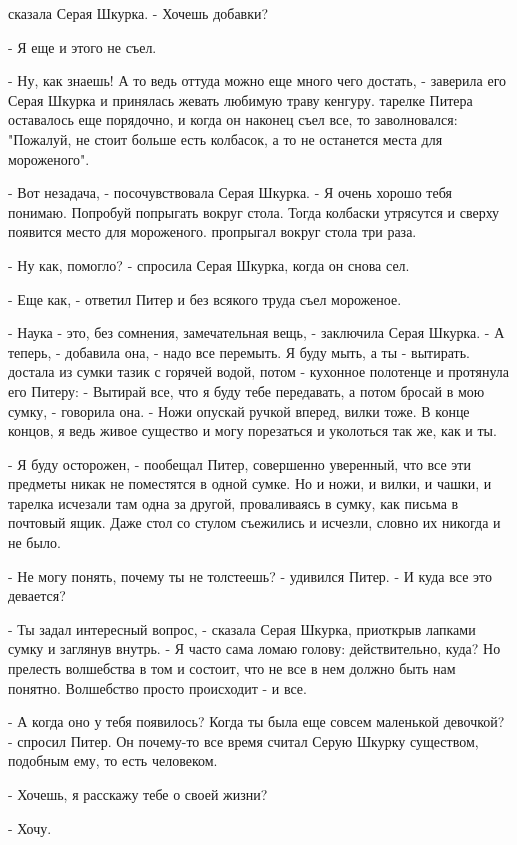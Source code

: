 сказала Серая Шкурка. - Хочешь добавки?
\par- Я еще и этого не съел.
\par- Ну, как знаешь! А то ведь оттуда можно еще много чего достать, - 
заверила его Серая Шкурка и принялась жевать любимую траву кенгуру.
 тарелке Питера оставалось еще порядочно, и когда он наконец 
съел все, то заволновался: "Пожалуй, не стоит больше есть колбасок, а 
то не останется места для мороженого".
\par- Вот незадача, - посочувствовала Серая Шкурка. - Я очень хорошо 
тебя понимаю. Попробуй попрыгать вокруг стола. Тогда колбаски 
утрясутся и сверху появится место для мороженого.
 пропрыгал вокруг стола три раза.
\par- Ну как, помогло? - спросила Серая Шкурка, когда он снова сел.
\par- Еще как, - ответил Питер и без всякого труда съел мороженое.
\par- Наука - это, без сомнения, замечательная вещь, - заключила Серая 
Шкурка. - А теперь, - добавила она, - надо все перемыть. Я буду мыть, 
а ты - вытирать.
 достала из сумки тазик с горячей водой, потом - кухонное 
полотенце и протянула его Питеру: - Вытирай все, что я буду тебе 
передавать, а потом бросай в мою сумку, - говорила она. - Ножи опускай 
ручкой вперед, вилки тоже. В конце концов, я ведь живое существо и 
могу порезаться и уколоться так же, как и ты.
\par- Я буду осторожен, - пообещал Питер, совершенно уверенный, что 
все эти предметы никак не поместятся в одной сумке. Но и ножи, и 
вилки, и чашки, и тарелка исчезали там одна за другой, проваливаясь в 
сумку, как письма в почтовый ящик. Даже стол со стулом съежились и 
исчезли, словно их никогда и не было.
\par- Не могу понять, почему ты не толстеешь? - удивился Питер. - И 
куда все это девается?
\par- Ты задал интересный вопрос, - сказала Серая Шкурка, приоткрыв 
лапками сумку и заглянув внутрь. - Я часто сама ломаю голову: 
действительно, куда? Но прелесть волшебства в том и состоит, что не 
все в нем должно быть нам понятно. Волшебство просто происходит - и 
все.
\par- А когда оно у тебя появилось? Когда ты была еще совсем маленькой 
девочкой? - спросил Питер. Он почему-то все время считал Серую Шкурку 
существом, подобным ему, то есть человеком.
\par- Хочешь, я расскажу тебе о своей жизни?
\par- Хочу.

